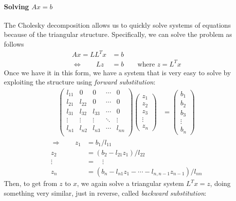 \documentclass[12pt]{article}
\theoremstyle{plain}
\theoremstyle{definition}
\theoremstyle{remark}
\begin{document}
\paragraph{Solving $Ax=b$} The Cholesky decomposition allows us to
quickly solve systems of equations because of the triangular
structure. Specifically, we can solve the problem as follows
\begin{align*}
  Ax = LL^Tx&=b\\
  \Leftrightarrow \quad \quad Lz&=b \qquad \text{where }z = L^T x
\end{align*}
Once we have it in this form, we have a system that is very easy to
solve by exploiting the structure using \emph{forward substitution}:
\begin{align*}
  \begin{pmatrix}
    l_{11} & 0      & 0 & \cdots & 0 \\
    l_{21} & l_{22} & 0 & \cdots & 0\\
    l_{31} & l_{32} & l_{33}& \cdots & 0\\
    \vdots & \vdots & \vdots & \ddots & \vdots\\
    l_{n1} & l_{n2} & l_{n3} &\cdots & l_{nn}\\
  \end{pmatrix}
  \begin{pmatrix}
    z_1 \\ z_2 \\ z_3 \\ \vdots \\ z_n
  \end{pmatrix}
  &=
  \begin{pmatrix}
    b_1 \\ b_2 \\ b_3 \\ \vdots \\ b_n
  \end{pmatrix}
\end{align*}
\begin{align*}
  \Rightarrow \qquad
  z_1 &= b_1/l_{11} \\
  z_2 &= (b_2 - l_{21}z_1)/l_{22} \\
  \vdots \; &= \quad \vdots\\
  z_n &= (b_n - l_{n1}z_1 - \cdots - l_{n,n-1}z_{n-1})/l_{nn}
\end{align*}
Then, to get from $z$ to $x$, we again solve a triangular system $L^Tx =
z$, doing something very similar, just in reverse, called \emph{backward
substitution}:
\end{document}
